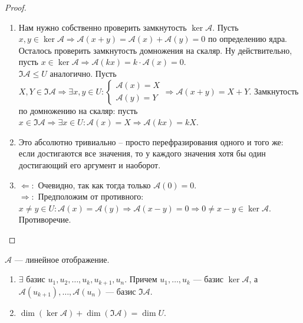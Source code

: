 \begin{proof}
    \begin{enumerate}
        \item Нам нужно собственно проверить замкнутость $\ker \mathcal{A}$. Пусть $x, y \in \ker \mathcal{A} \Rightarrow \mathcal{A}(x + y) = \mathcal{A}(x) + \mathcal{A}(y) = 0$ по определению ядра. Осталось проверить замкнутость домножения на скаляр. Ну действительно, пусть $x \in \ker \mathcal{A} \Rightarrow \mathcal{A}(kx) = k \cdot \mathcal{A}(x) = 0$.\\
        $\Im \mathcal{A} \le U$ аналогично. Пусть $X, Y \in \Im \mathcal{A} \Rightarrow \exists x, y \in U : \begin{cases}\mathcal{A}(x) = X\\
        \mathcal{A}(y) = Y\end{cases} \Rightarrow \mathcal{A}(x + y) = X + Y$. Замкнутость по домножению на скаляр: пусть $x \in \Im \mathcal{A} \Rightarrow \exists x \in U : \mathcal{A}(x) = X \Rightarrow \mathcal{A}(kx) = kX$. 
        \item Это абсолютно тривиально -- просто перефразирования одного и того же: если достигаются все значения, то у каждого значения хотя бы один достигающий его аргумент и наоборот.
        \item $\Leftarrow\!:$ Очевидно, так как тогда только $\mathcal{A}(0) = 0$.\\
        $\Rightarrow\!:$ Предположим от противного: $x \neq y \in U : \mathcal{A}(x) = \mathcal{A}(y) \Rightarrow \mathcal{A}(x - y) = 0 \Rightarrow 0 \neq x - y \in \ker \mathcal{A}$. Противоречие.
    \end{enumerate}
\end{proof}
\begin{theorem}
    $\mathcal{A}$ --- линейное отображение.
     \begin{enumerate}
         \item $\exists$ базис  $u_1, u_2, \ldots, u_k, u_{k+1}, u_n$. Причем $u_1, \ldots, u_k$ --- базис $\ker \mathcal{A}$, а  $\mathcal{A}(u_{k+1}), \ldots, \mathcal{A}(u_n)$ --- базис $\Im \mathcal{A}$.
         \item  $\dim (\ker \mathcal{A}) + \dim (\Im \mathcal{A}) = \dim U$.
    \end{enumerate}
\end{theorem}
